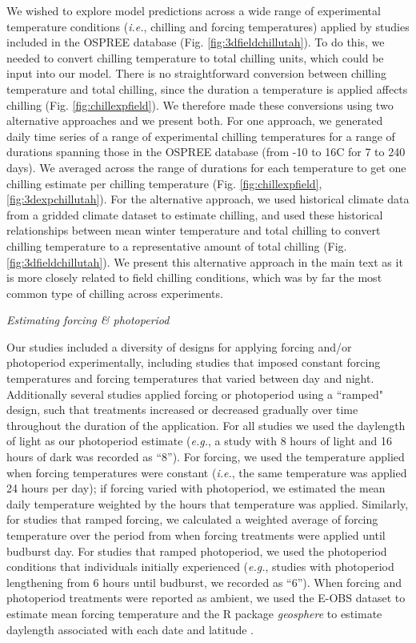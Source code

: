 \documentclass{article}
\begin{document}
\par We wished to explore model predictions across a wide range of experimental temperature conditions (\emph{i.e.}, chilling and forcing temperatures) applied by studies included in the OSPREE database (Fig. \ref{fig:3dfieldchillutah}). To do this, we needed to convert chilling temperature to total chilling units, which could be input into our model. There is no straightforward conversion between chilling temperature and total chilling, since the duration a temperature is applied affects chilling (Fig. \ref{fig:chillexpfield}). We therefore made these conversions using two alternative approaches and we present both. For one approach, we generated daily time series of a range of experimental chilling temperatures for a range of durations spanning those in the OSPREE database (from -10 to 16\degree C for 7 to 240 days). We averaged across the range of durations for each temperature to get one chilling estimate per chilling temperature (Fig. \ref{fig:chillexpfield}, \ref{fig:3dexpchillutah}). For the alternative approach, we used historical climate data from a gridded climate dataset \emph{\citep[{\normalfont E-OBS},][]{cornes2018}} to estimate chilling, and used these historical relationships between mean winter temperature and total chilling to  convert chilling temperature to a representative amount of total chilling (Fig. \ref{fig:3dfieldchillutah}). We present this alternative approach in the main text as it is more closely related to field chilling conditions, which was by far the most common type of chilling across experiments.

\par{\emph{Estimating forcing \& photoperiod}}

Our studies included a diversity of designs for applying forcing and/or photoperiod experimentally, including studies that imposed constant forcing temperatures and forcing temperatures that varied between day and night.  Additionally several studies applied forcing or photoperiod using a ``ramped" design, such that treatments increased or decreased gradually over time throughout the duration of the application. For all studies we used the daylength of light as our photoperiod estimate (\emph{e.g.}, a study with 8 hours of light and 16 hours of dark was recorded as ``8''). For forcing, we used the temperature applied when forcing temperatures were constant (\emph{i.e.}, the same temperature was applied 24 hours per day); if forcing varied with photoperiod, we estimated the mean daily temperature weighted by the hours that temperature was applied. Similarly, for studies that ramped forcing, we calculated a weighted average of forcing temperature over the period from when forcing treatments were applied until budburst day. For studies that ramped photoperiod, we used the photoperiod conditions that individuals initially experienced (\emph{e.g.}, studies with photoperiod lengthening from 6 hours until budburst, we recorded as ``6''). When forcing and photoperiod treatments were reported as ambient, we used the E-OBS  dataset to estimate mean forcing temperature and the R package \emph{geosphere} to estimate daylength associated with each  date and latitude \emph{\citep{cornes2018}}. 
\end{document}
